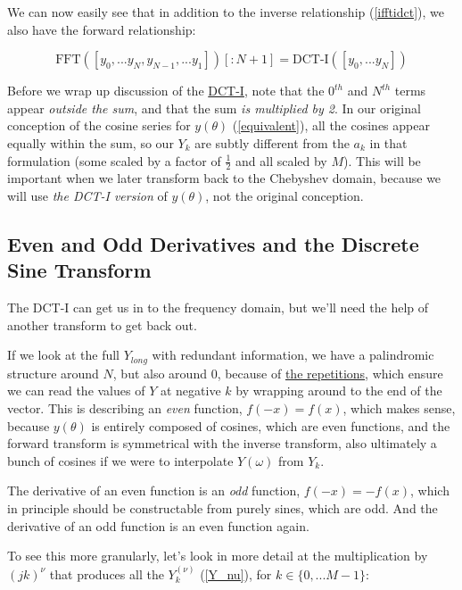 \documentclass[10pt]{article}
\begin{document}
We can now easily see that in addition to the inverse relationship (\autoref{ifftidct}), we also have the forward relationship:

$$\text{FFT}([y_0, ... y_N, y_{N-1}, ... y_1])[:\!N+1] = \text{DCT-I}([y_0, ... y_N])$$

Before we wrap up discussion of the \href{https://docs.scipy.org/doc/scipy/reference/generated/scipy.fft.dct.html}{DCT-I}\cite{dct}, note that the $0^{th}$ and $N^{th}$ terms appear \textit{outside the sum}, and that the sum \textit{is multiplied by 2}. In our original conception of the cosine series for $y(\theta)$ (\autoref{equivalent}), all the cosines appear equally within the sum, so our $Y_k$ are subtly different from the $a_k$ in that formulation (some scaled by a factor of $\frac{1}{2}$ and all scaled by $M$). This will be important when we later transform back to the Chebyshev domain, because we will use \textit{the DCT-I version} of $y(\theta)$, not the original conception.

\subsection{Even and Odd Derivatives and the Discrete Sine Transform}

The DCT-I can get us in to the frequency domain, but we'll need the help of another transform to get back out.

If we look at the full $Y_{long}$ with redundant information, we have a palindromic structure around $N$, but also around $0$, because of \href{https://dsp.stackexchange.com/a/18931/40873}{the repetitions}\cite{bristow}, which ensure we can read the values of $Y$ at negative $k$ by wrapping around to the end of the vector. This is describing an \textit{even} function, $f(-x) = f(x)$, which makes sense, because $y(\theta)$ is entirely composed of cosines, which are even functions, and the forward transform is symmetrical with the inverse transform, also ultimately a bunch of cosines if we were to interpolate $Y(\omega)$ from $Y_k$.

The derivative of an even function is an \textit{odd} function, $f(-x) = -f(x)$, which in principle should be constructable from purely sines, which are odd. And the derivative of an odd function is an even function again.

To see this more granularly, let's look in more detail at the multiplication by $(jk)^\nu$ that produces all the $Y_k^{(\nu)}$ (\autoref{Y_nu}), for $k \in \{0, ... M-1\}$:\vspace{-2mm}
\end{document}
